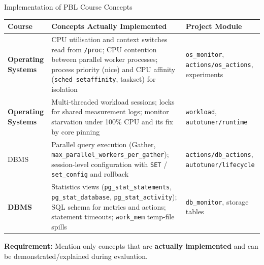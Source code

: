 \documentclass[aspectratio=169,11pt]{beamer}
\begin{document}
\begin{frame}{Implementation of PBL Course Concepts}

\scriptsize

\begin{center}

\renewcommand{\arraystretch}{1.3}

\begin{tabularx}{.96\textwidth}
{@{}>{\bfseries}p{2.6cm}X p{3.0cm}@{}}

\toprule
Course & Concepts Actually Implemented & Project Module\\
\midrule

Operating Systems &
CPU utilisation and context switches read from \texttt{/proc}; CPU contention between
parallel worker processes; process priority (nice) and CPU affinity
(\texttt{sched\_setaffinity}, taskset) for isolation &
\texttt{os\_monitor}, \texttt{actions/os\_actions}, experiments\\

Operating Systems &
Multi-threaded workload sessions; locks for shared measurement logs;
monitor starvation under 100\% CPU and its fix by core pinning &
\texttt{workload}, \texttt{autotuner/runtime}\\

\midrule

DBMS &
Parallel query execution (Gather, \texttt{max\_parallel\_workers\_per\_gather});
session-level configuration with \texttt{SET} / \texttt{set\_config} and rollback &
\texttt{actions/db\_actions}, \texttt{autotuner/lifecycle}\\

DBMS &
Statistics views (\texttt{pg\_stat\_statements}, \texttt{pg\_stat\_database},
\texttt{pg\_stat\_activity}); SQL schema for metrics and actions;
statement timeouts; \texttt{work\_mem} temp-file spills &
\texttt{db\_monitor}, storage tables\\

\bottomrule

\end{tabularx}

\end{center}

\vfill

\begin{center}
\colorbox{GEULightBlue}{
\parbox{.88\textwidth}{
\centering
\textbf{Requirement:}
Mention only concepts that are \textbf{actually implemented}
and can be demonstrated/explained during evaluation.
}}
\end{center}

\end{frame}
\end{document}

